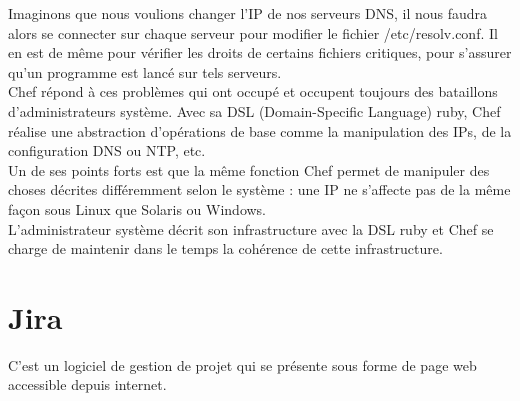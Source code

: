 Imaginons que nous voulions changer l'IP de nos serveurs DNS, il nous faudra
alors se connecter sur chaque serveur pour modifier le fichier
/etc/resolv.conf. Il en est de même pour vérifier les droits de certains
fichiers critiques, pour s'assurer qu'un programme est lancé sur tels
serveurs.\\

Chef répond à ces problèmes qui ont occupé et occupent toujours des bataillons
d'administrateurs système. Avec sa DSL (Domain-Specific Language) ruby, Chef
réalise une abstraction d'opérations de base comme la manipulation des IPs, de la
configuration DNS ou NTP, etc. \\
Un de ses points forts est que la même fonction Chef permet de manipuler des
choses décrites différemment selon le système : une IP ne s'affecte pas de la
même façon sous Linux que Solaris ou Windows.\\
L'administrateur système décrit son infrastructure avec la DSL ruby et Chef
se charge de maintenir dans le temps la cohérence de cette infrastructure.





\section{Jira}

C'est un logiciel de gestion de projet qui se présente sous forme de page web
accessible depuis internet.

